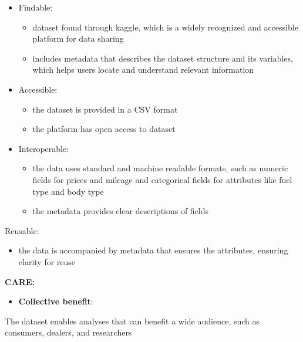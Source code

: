 \documentclass[
  letterpaper,
  DIV=11,
  numbers=noendperiod]{scrartcl}
\providecommand{\tightlist}{%
  \setlength{\itemsep}{0pt}\setlength{\parskip}{0pt}}\usepackage{longtable,booktabs,array}
\begin{document}
\begin{itemize}
\item
  Findable:

  \begin{itemize}
  \item
    dataset found through kaggle, which is a widely recognized and
    accessible platform for data sharing
  \item
    includes metadata that describes the dataset structure and its
    variables, which helps users locate and understand relevant
    information
  \end{itemize}
\item
  Accessible:

  \begin{itemize}
  \item
    the dataset is provided in a CSV format
  \item
    the platform has open access to dataset
  \end{itemize}
\item
  Interoperable:

  \begin{itemize}
  \item
    the data uses standard and machine readable formats, such as numeric
    fields for prices and mileage and categorical fields for attributes
    like fuel type and body type
  \item
    the metadata provides clear descriptions of fields
  \end{itemize}
\end{itemize}

Reusable:

\begin{itemize}
\tightlist
\item
  the data is accompanied by metadata that ensures the attributes,
  ensuring clarity for reuse
\end{itemize}

\textbf{CARE:}

\begin{itemize}
\tightlist
\item
  \textbf{Collective benefit}:
\end{itemize}

The dataset enables analyses that can benefit a wide audience, such as
consumers, dealers, and researchers
\end{document}
